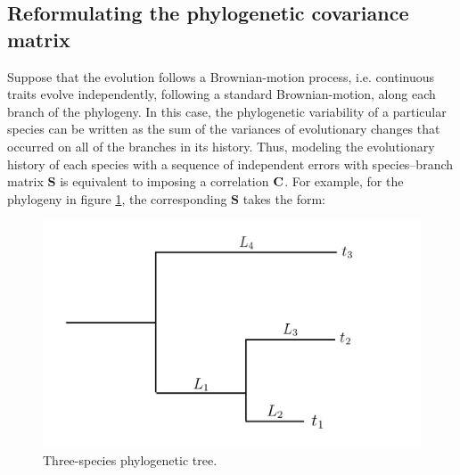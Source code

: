 \documentclass[12pt]{article}
\begin{document}

\subsection*{Reformulating the phylogenetic covariance matrix}


\newcommand{\bS}{{\mathbf S}}
\newcommand{\bJ}{{\mathbf J}}
\newcommand{\bB}{{\mathbf B}}
\newcommand{\bBadj}{{\mathbf B}_{\mbox{\tiny adj}}}
\newcommand{\bomega}{{\boldsymbol \omega}}
\newcommand{\bell}{{\boldsymbol \ell}}
\newcommand{\e}{{ \epsilon}}

Suppose that the evolution follows a Brownian-motion process, i.e. continuous traits evolve independently, following a standard Brownian-motion, along each branch of the phylogeny.
In this case, the phylogenetic variability of a particular species can be written as the sum of the variances of evolutionary changes that occurred on all of the branches in its history. 
Thus, modeling the evolutionary history of each species with a sequence of independent errors with species--branch matrix $\bS$ is equivalent to imposing a correlation ${\mathbf C}$.
For example, for the phylogeny in figure \ref{fig:tree}, the corresponding $\bS$ takes the form:

\begin{center}
\begin{figure}[H]
  \includegraphics[scale=0.8,page=1]{./figure/phylotree.png}
  \caption{Three-species phylogenetic tree.}
\label{fig:tree}
\end{figure}
\end{center}
\end{document}
